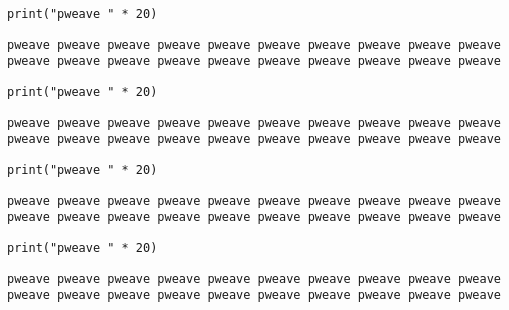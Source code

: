 \begin{verbatim}
print("pweave " * 20)
\end{verbatim}
\begin{verbatim}
pweave pweave pweave pweave pweave pweave pweave pweave pweave pweave
pweave pweave pweave pweave pweave pweave pweave pweave pweave pweave
\end{verbatim}



\begin{verbatim}
print("pweave " * 20)
\end{verbatim}
\begin{verbatim}
pweave pweave pweave pweave pweave pweave pweave pweave pweave pweave pweave pweave pweave pweave pweave pweave pweave pweave pweave pweave
\end{verbatim}



\begin{verbatim}
print("pweave " * 20)
\end{verbatim}
\begin{verbatim}
pweave pweave pweave pweave pweave pweave pweave pweave pweave pweave pweave pweave pweave pweave pweave pweave pweave pweave pweave pweave
\end{verbatim}



\begin{verbatim}
print("pweave " * 20)
\end{verbatim}
\begin{verbatim}
pweave pweave pweave pweave pweave pweave pweave pweave pweave pweave
pweave pweave pweave pweave pweave pweave pweave pweave pweave pweave
\end{verbatim}

